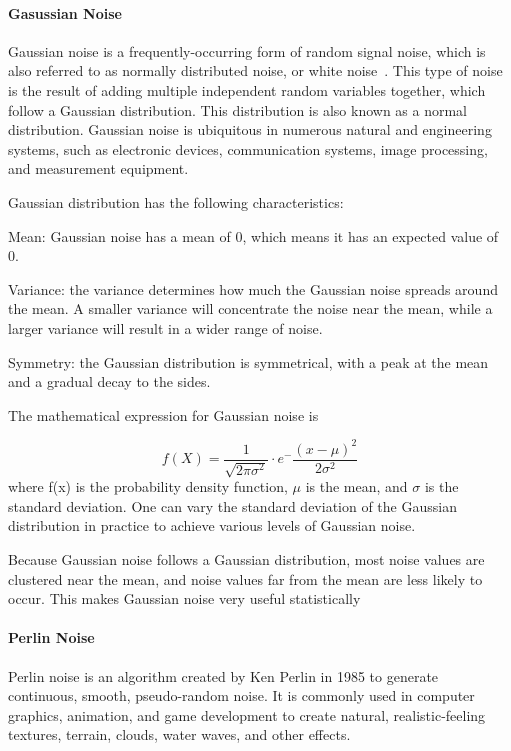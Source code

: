 \documentclass[runningheads,a4paper]{llncs}
\begin{document}
\paragraph{Gasussian Noise}
Gaussian noise is a frequently-occurring form of random signal noise, which is also referred to as normally distributed noise, or white noise~\cite{jain1989fundamentals}. This type of noise is the result of adding multiple independent random variables together, which follow a Gaussian distribution. This distribution is also known as a normal distribution. Gaussian noise is ubiquitous in numerous natural and engineering systems, such as electronic devices, communication systems, image processing, and measurement equipment.

Gaussian distribution has the following characteristics:

Mean: Gaussian noise has a mean of 0, which means it has an expected value of 0.

Variance: the variance determines how much the Gaussian noise spreads around the mean. 
A smaller variance will concentrate the noise near the mean, while a larger variance will result in a wider range of noise.

Symmetry: the Gaussian distribution is symmetrical, with a peak at the mean and a gradual decay to the sides.

The mathematical expression for Gaussian noise is

\begin{equation}
f(X) = \frac{1}{\sqrt{2\pi\sigma^2}}\cdot e^-\frac{(x-\mu)^2}{2\sigma^2}
\end{equation}
where f(x) is the probability density function, $\mu$ is the mean, and $\sigma$ is the standard deviation.
One can vary the standard deviation of the Gaussian distribution in practice to achieve various levels of Gaussian noise.

Because Gaussian noise follows a Gaussian distribution, most noise values are clustered near the mean, and noise values far from the mean are less likely to occur. This makes Gaussian noise very useful statistically

\paragraph{Perlin Noise}
Perlin noise is an algorithm created by Ken Perlin in 1985 to generate continuous, smooth, pseudo-random noise\cite{perlin1985image}. It is commonly used in computer graphics, animation, and game development to create natural, realistic-feeling textures, terrain, clouds, water waves, and other effects\cite{green2005implementing}.
\end{document}
